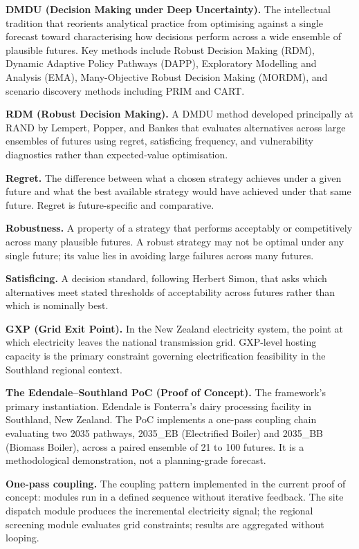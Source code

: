 \documentclass[
  11pt,
  a4paper,
  twoside,
  openright]{scrbook}
\begin{document}
\textbf{DMDU (Decision Making under Deep Uncertainty).} The intellectual
tradition that reorients analytical practice from optimising against a
single forecast toward characterising how decisions perform across a
wide ensemble of plausible futures. Key methods include Robust Decision
Making (RDM), Dynamic Adaptive Policy Pathways (DAPP), Exploratory
Modelling and Analysis (EMA), Many-Objective Robust Decision Making
(MORDM), and scenario discovery methods including PRIM and CART.

\textbf{RDM (Robust Decision Making).} A DMDU method developed
principally at RAND by Lempert, Popper, and Bankes that evaluates
alternatives across large ensembles of futures using regret, satisficing
frequency, and vulnerability diagnostics rather than expected-value
optimisation.

\textbf{Regret.} The difference between what a chosen strategy achieves
under a given future and what the best available strategy would have
achieved under that same future. Regret is future-specific and
comparative.

\textbf{Robustness.} A property of a strategy that performs acceptably
or competitively across many plausible futures. A robust strategy may
not be optimal under any single future; its value lies in avoiding large
failures across many futures.

\textbf{Satisficing.} A decision standard, following Herbert Simon, that
asks which alternatives meet stated thresholds of acceptability across
futures rather than which is nominally best.

\textbf{GXP (Grid Exit Point).} In the New Zealand electricity system,
the point at which electricity leaves the national transmission grid.
GXP-level hosting capacity is the primary constraint governing
electrification feasibility in the Southland regional context.

\textbf{The Edendale--Southland PoC (Proof of Concept).} The framework's
primary instantiation. Edendale is Fonterra's dairy processing facility
in Southland, New Zealand. The PoC implements a one-pass coupling chain
evaluating two 2035 pathways, 2035\_EB (Electrified Boiler) and 2035\_BB
(Biomass Boiler), across a paired ensemble of 21 to 100 futures. It is a
methodological demonstration, not a planning-grade forecast.

\textbf{One-pass coupling.} The coupling pattern implemented in the
current proof of concept: modules run in a defined sequence without
iterative feedback. The site dispatch module produces the incremental
electricity signal; the regional screening module evaluates grid
constraints; results are aggregated without looping.
\end{document}
